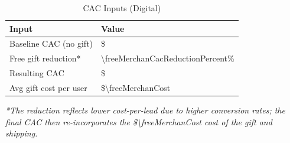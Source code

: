 \begin{table}[H]
\centering
\caption{CAC Inputs (Digital)}
\begin{tabularx}{\linewidth}{l Y}
\toprule
Input & Value \\\midrule
Baseline CAC (no gift) & \$\numint{\cacDigitalWithoutFreeMerchan} \\
Free gift reduction* & \num{\freeMerchanCacReductionPercent}\% \\
Resulting CAC & \$\numint{\cacDigital} \\
Avg gift cost per user & \$\num{\freeMerchanCost} \\
\bottomrule
\end{tabularx}
\end{table}
\textit{*The reduction reflects lower cost-per-lead due to higher conversion rates; the final CAC then re-incorporates the \$\num{\freeMerchanCost} cost of the gift and shipping.}

